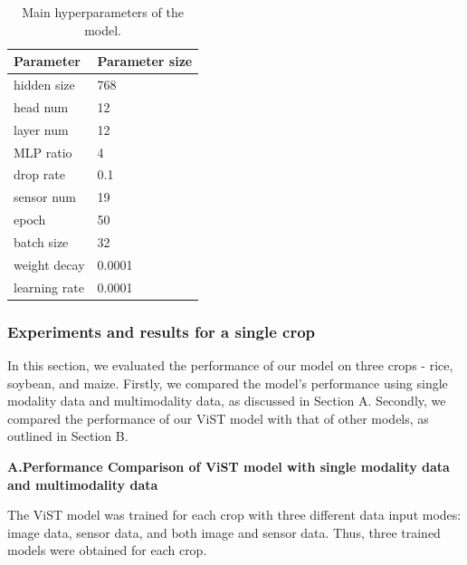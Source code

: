 \documentclass[acmsmall, screen]{acmart}
\begin{document}
\begin{table}[htbp]
  \centering
  \caption{Main hyperparameters of the model.}
  \begin{tabular}{ll}
    \toprule
    Parameter     & \multicolumn{1}{l}{Parameter size} \\
    \midrule
    hidden size   & 768                                \\
    head num      & 12                                 \\
    layer num     & 12                                 \\
    MLP ratio     & 4                                  \\
    drop rate     & 0.1                                \\
    sensor num    & 19                                 \\
    epoch         & 50                                 \\
    batch size    & 32                                 \\
    weight decay  & 0.0001                             \\
    learning rate & 0.0001                             \\

    \bottomrule
  \end{tabular}%
  \label{tab:hyperparameters}%
\end{table}%

\subsubsection{Experiments and results for a single crop}


In this section, we evaluated the performance of our model on three crops - rice, soybean, and maize. Firstly, we compared the model's performance using single modality data and multimodality data, as discussed in Section A. Secondly, we compared the performance of our ViST model with that of other models, as outlined in Section B.

\textbf{A.Performance Comparison of ViST model with single modality data and multimodality data}	

The ViST model was trained for each crop with three different data input modes: image data, sensor data, and both image and sensor data. Thus, three trained models were obtained for each crop.
\end{document}
